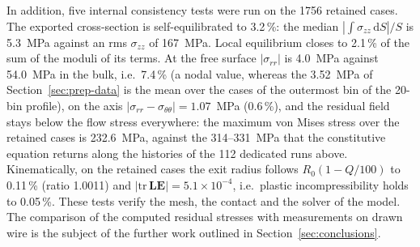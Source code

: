 In addition, five internal consistency tests were run on the 1756 retained cases. The exported cross-section is self-equilibrated to 3.2\,\%: the median $|\int\sigma_{zz}\,\mathrm{d}S|/S$ is 5.3~MPa against an rms $\sigma_{zz}$ of 167~MPa. %
Local equilibrium closes to 2.1\,\% of the sum of the moduli of its terms. %
At the free surface $|\sigma_{rr}|$ is 4.0~MPa against 54.0~MPa in the bulk, i.e.\ 7.4\,\% (a nodal value, whereas the 3.52~MPa of Section~\ref{sec:prep-data} is the mean over the cases of the outermost bin of the 20-bin profile), %
on the axis $|\sigma_{rr}-\sigma_{\theta\theta}| = 1.07$~MPa (0.6\,\%), %
and the residual field stays below the flow stress everywhere: the maximum von Mises stress over the retained cases is 232.6~MPa, against the 314--331~MPa that the constitutive equation returns along the histories of the 112 dedicated runs above.
Kinematically, on the retained cases the exit radius follows $R_0(1-Q/100)$ to 0.11\,\% (ratio 1.0011) and $|\mathrm{tr}\,\mathbf{LE}| = 5.1\times10^{-4}$, i.e.\ plastic incompressibility holds to 0.05\,\%. %
These tests verify the mesh, the contact and the solver of the model. The comparison of the computed residual stresses with measurements on drawn wire is the subject of the further work outlined in Section~\ref{sec:conclusions}. %
